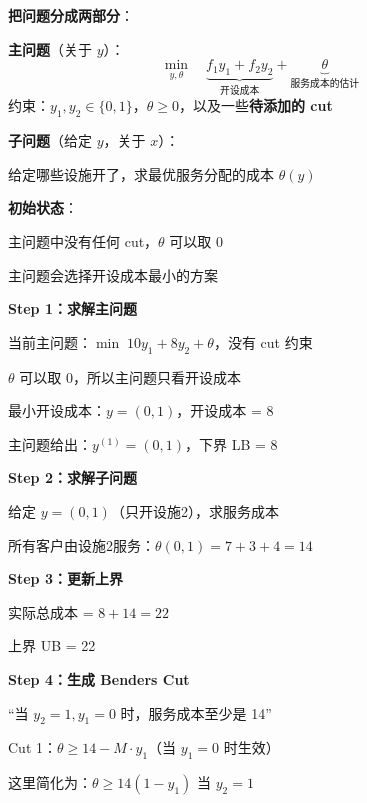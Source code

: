 \documentclass[12pt, a4paper]{ctexart}
\begin{document}
\begin{blackboard}

\textbf{把问题分成两部分}：

\textbf{主问题}（关于 $y$）：
\[
\min_{y, \theta} \quad \underbrace{f_1 y_1 + f_2 y_2}_{\text{开设成本}} + \underbrace{\theta}_{\text{服务成本的估计}}
\]
约束：$y_1, y_2 \in \{0, 1\}$，$\theta \geq 0$，以及一些\textbf{待添加的 cut}

\textbf{子问题}（给定 $y$，关于 $x$）：

给定哪些设施开了，求最优服务分配的成本 $\theta(y)$

\textbf{初始状态}：

主问题中没有任何 cut，$\theta$ 可以取 0

主问题会选择开设成本最小的方案

\end{blackboard}

\begin{blackboard}[Benders 迭代：第1轮]

\textbf{Step 1：求解主问题}

当前主问题：$\min \; 10 y_1 + 8 y_2 + \theta$，没有 cut 约束

$\theta$ 可以取 0，所以主问题只看开设成本

最小开设成本：$y = (0, 1)$，开设成本 = 8

主问题给出：$y^{(1)} = (0, 1)$，下界 LB = 8

\textbf{Step 2：求解子问题}

给定 $y = (0, 1)$（只开设施2），求服务成本

所有客户由设施2服务：$\theta(0,1) = 7 + 3 + 4 = 14$

\textbf{Step 3：更新上界}

实际总成本 = $8 + 14 = 22$

上界 UB = 22

\textbf{Step 4：生成 Benders Cut}

``当 $y_2 = 1, y_1 = 0$ 时，服务成本至少是 14''

Cut 1：$\theta \geq 14 - M \cdot y_1$（当 $y_1 = 0$ 时生效）

这里简化为：$\theta \geq 14 (1 - y_1)$ 当 $y_2 = 1$

\end{blackboard}
\end{document}
